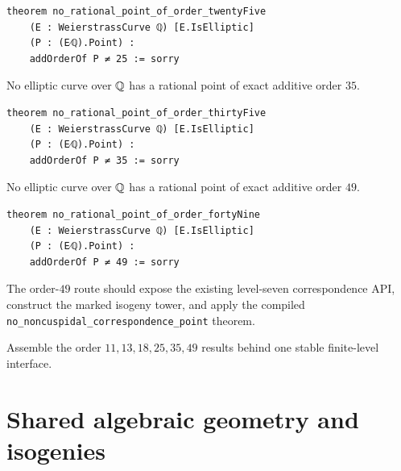 \begin{verbatim}
theorem no_rational_point_of_order_twentyFive
    (E : WeierstrassCurve ℚ) [E.IsElliptic]
    (P : (E⁄ℚ).Point) :
    addOrderOf P ≠ 25 := sorry
\end{verbatim}

\begin{theorem}\label{node:MT-O35-EXCLUDE}
No elliptic curve over \(\mathbb{Q}\) has a rational point of exact additive order
\(35\).
\leanpending
\end{theorem}

\begin{verbatim}
theorem no_rational_point_of_order_thirtyFive
    (E : WeierstrassCurve ℚ) [E.IsElliptic]
    (P : (E⁄ℚ).Point) :
    addOrderOf P ≠ 35 := sorry
\end{verbatim}

\begin{theorem}\label{node:MT-O49-TOWER}
No elliptic curve over \(\mathbb{Q}\) has a rational point of exact additive order
\(49\).
\leanpending
\end{theorem}

\begin{verbatim}
theorem no_rational_point_of_order_fortyNine
    (E : WeierstrassCurve ℚ) [E.IsElliptic]
    (P : (E⁄ℚ).Point) :
    addOrderOf P ≠ 49 := sorry
\end{verbatim}

The order-\(49\) route should expose the existing level-seven correspondence
API, construct the marked isogeny tower, and apply the compiled
\texttt{no\_noncuspidal\_correspondence\_point} theorem.

\begin{milestone}\label{node:MT-FINITE-JOIN}
Assemble the order \(11,13,18,25,35,49\) results behind one stable finite-level
interface.
\leanpending
\end{milestone}

\chapter{Shared algebraic geometry and isogenies}

